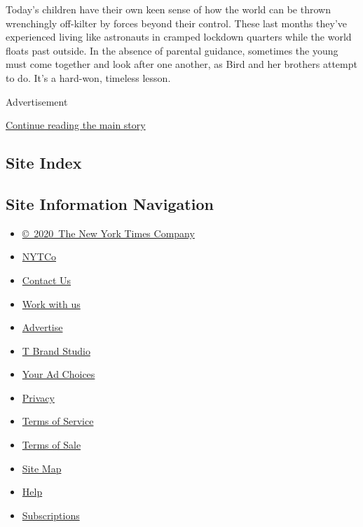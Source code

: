 Today's children have their own keen sense of how the world can be
thrown wrenchingly off-kilter by forces beyond their control. These last
months they've experienced living like astronauts in cramped lockdown
quarters while the world floats past outside. In the absence of parental
guidance, sometimes the young must come together and look after one
another, as Bird and her brothers attempt to do. It's a hard-won,
timeless lesson.

Advertisement

\protect\hyperlink{after-bottom}{Continue reading the main story}

\hypertarget{site-index}{%
\subsection{Site Index}\label{site-index}}

\hypertarget{site-information-navigation}{%
\subsection{Site Information
Navigation}\label{site-information-navigation}}

\begin{itemize}
\tightlist
\item
  \href{https://help.nytimes3xbfgragh.onion/hc/en-us/articles/115014792127-Copyright-notice}{©~2020~The
  New York Times Company}
\end{itemize}

\begin{itemize}
\tightlist
\item
  \href{https://www.nytco.com/}{NYTCo}
\item
  \href{https://help.nytimes3xbfgragh.onion/hc/en-us/articles/115015385887-Contact-Us}{Contact
  Us}
\item
  \href{https://www.nytco.com/careers/}{Work with us}
\item
  \href{https://nytmediakit.com/}{Advertise}
\item
  \href{http://www.tbrandstudio.com/}{T Brand Studio}
\item
  \href{https://www.nytimes3xbfgragh.onion/privacy/cookie-policy\#how-do-i-manage-trackers}{Your
  Ad Choices}
\item
  \href{https://www.nytimes3xbfgragh.onion/privacy}{Privacy}
\item
  \href{https://help.nytimes3xbfgragh.onion/hc/en-us/articles/115014893428-Terms-of-service}{Terms
  of Service}
\item
  \href{https://help.nytimes3xbfgragh.onion/hc/en-us/articles/115014893968-Terms-of-sale}{Terms
  of Sale}
\item
  \href{https://spiderbites.nytimes3xbfgragh.onion}{Site Map}
\item
  \href{https://help.nytimes3xbfgragh.onion/hc/en-us}{Help}
\item
  \href{https://www.nytimes3xbfgragh.onion/subscription?campaignId=37WXW}{Subscriptions}
\end{itemize}
